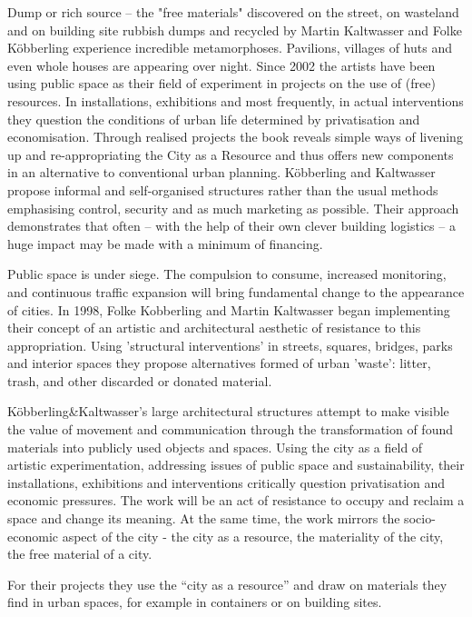 \begin{itemize}
Dump or rich source – the "free materials" discovered on the street, on wasteland and on building site rubbish dumps and recycled by Martin Kaltwasser and Folke Köbberling experience incredible metamorphoses. Pavilions, villages of huts and even whole houses are appearing over night. Since 2002 the artists have been using public space as their field of experiment in projects on the use of (free) resources. In installations, exhibitions and most frequently, in actual interventions they question the conditions of urban life determined by privatisation and economisation. Through realised projects the book reveals simple ways of livening up and re-appropriating the City as a Resource and thus offers new components in an alternative to conventional urban planning. Köbberling and Kaltwasser propose informal and self-organised structures rather than the usual methods emphasising control, security and as much marketing as possible. Their approach demonstrates that often – with the help of their own clever building logistics – a huge impact may be made with a minimum of financing.

Public space is under siege. The compulsion to consume, increased monitoring, and continuous traffic expansion will bring fundamental change to the appearance of cities. In 1998, Folke Kobberling and Martin Kaltwasser began implementing their concept of an artistic and architectural aesthetic of resistance to this appropriation. Using 'structural interventions' in streets, squares, bridges, parks and interior spaces they propose alternatives formed of urban 'waste': litter, trash, and other discarded or donated material. 

Köbberling\&Kaltwasser’s large architectural structures attempt to make visible the value of movement and communication through the transformation of found materials into publicly used objects and spaces. Using the city as a field of artistic experimentation, addressing issues of public space and sustainability, their installations, exhibitions and interventions critically question privatisation and economic pressures. The work will be an act of resistance to occupy and reclaim a space and change its meaning. At the same time, the work mirrors the socio-economic aspect of the city - the city as a resource, the materiality of the city, the free material of a city. 

For their projects they use the “city as a resource” and draw on materials they find in urban spaces, for example in containers or on building sites.


\end{itemize}
